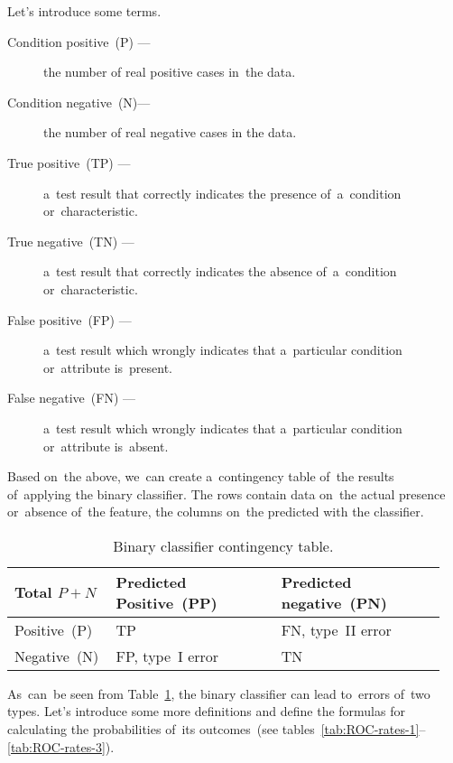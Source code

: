 \documentclass[]{scrreprt}
\begin{document}
Let's introduce some terms.
\begin{description}
	\item[Condition positive~(P) --- ] the number of real positive cases in~the data.
	\item[Condition negative~(N)---] the number of real negative cases in the data.
	\item[True positive~(TP) ---] a~test result that correctly indicates the presence of~a~condition or~characteristic.
	\item[True negative~(TN) ---] a~test result that correctly indicates the absence of~a~condition or~characteristic.
	\item[False positive~(FP) ---] a~test result which wrongly indicates that a~particular condition or~attribute is~present.
	\item[False negative~(FN) ---] a~test result which wrongly indicates that a~particular condition or~attribute is~absent.
\end{description}
Based on~the above, we~can create a~contingency table of~the results of~applying the binary classifier. The rows contain data on~the actual presence or~absence of~the feature, the columns on~the predicted with the classifier.
%
\begin{table}[ht]
	\caption{Binary classifier contingency table.}  \label{tab:ROC-contingency-table}
	\centering
	\begin{tabularx}{\textwidth}{p{0.2\linewidth} p{0.375\linewidth} p{0.375\linewidth}} 
		\hline
	Total $P+N$&Predicted Positive~(PP)&Predicted negative~(PN)\\
		\hline
		Positive~(P)&TP&FN, type~II error~\cite{Wiki:type-1-2-errors}\\
		\hline
		Negative~(N)&FP, type~I error~\cite{Wiki:type-1-2-errors}&TN\\
		\hline
	\end{tabularx}
\end{table}
%
As~can~be seen from Table~\ref{tab:ROC-contingency-table}, the binary classifier can lead to~errors of~two types. Let's introduce some more definitions and define the formulas for calculating the probabilities of~its outcomes~(see tables~\ref{tab:ROC-rates-1}--\ref{tab:ROC-rates-3}).
%
\end{document}

